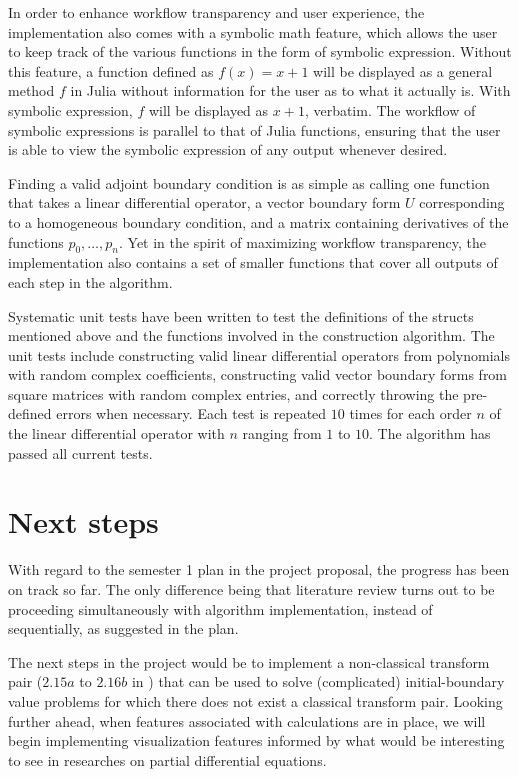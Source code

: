 \documentclass[11pt, oneside, a4paper]{article}
\begin{document}
In order to enhance workflow transparency and user experience, the implementation also comes with a symbolic math feature, which allows the user to keep track of the various functions in the form of symbolic expression. Without this feature, a function defined as $f(x)=x+1$ will be displayed as a general method $f$ in Julia without information for the user as to what it actually is. With symbolic expression, $f$ will be displayed as $x+1$, verbatim. The workflow of symbolic expressions is parallel to that of Julia functions, ensuring that the user is able to view the symbolic expression of any output whenever desired.

Finding a valid adjoint boundary condition is as simple as calling one function that takes a linear differential operator, a vector boundary form $U$ corresponding to a homogeneous boundary condition, and a matrix containing derivatives of the functions $p_0,\ldots, p_n$. Yet in the spirit of maximizing workflow transparency, the implementation also contains a set of smaller functions that cover all outputs of each step in the algorithm.

Systematic unit tests have been written to test the definitions of the structs mentioned above and the functions involved in the construction algorithm. The unit tests include constructing valid linear differential operators from polynomials with random complex coefficients, constructing valid vector boundary forms from square matrices with random complex entries, and correctly throwing the pre-defined errors when necessary. Each test is repeated $10$ times for each order $n$ of the linear differential operator with $n$ ranging from $1$ to $10$. The algorithm has passed all current tests.

\section{Next steps}
With regard to the semester 1 plan in the project proposal, the progress has been on track so far. The only difference being that literature review turns out to be proceeding simultaneously with algorithm implementation, instead of sequentially, as suggested in the plan.

The next steps in the project would be to implement a non-classical transform pair ($2.15a$ to $2.16b$ in \cite{Smith2016}) that can be used to solve (complicated) initial-boundary value problems for which there does not exist a classical transform pair. Looking further ahead, when features associated with calculations are in place, we will begin implementing visualization features informed by what would be interesting to see in researches on partial differential equations.

\newpage


\end{document}
